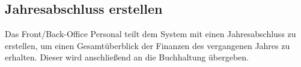 \documentclass[../SubfileFeatures.tex]{subfiles}
\begin{document}
    \subsection{Jahresabschluss erstellen}
    Das Front/Back-Office Personal teilt dem System mit einen Jahresabschluss zu erstellen,
    um einen Gesamtüberblick der Finanzen des vergangenen Jahres zu erhalten.
    Dieser wird anschließend an die Buchhaltung übergeben.
\end{document}
